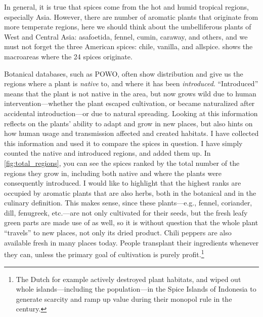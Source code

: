 In general, it is true that spices come from the hot and humid tropical regions, especially Asia. However, there are number of aromatic plants that originate from more temperate regions, here we should think about the umbelliferous plants of West and Central Asia: asafoetida, fennel, cumin, caraway, and others, and we must not forget the three American spices: chile, vanilla, and allspice.  shows the macroareas where the 24 spices originate.

Botanical databases, such as \gls{POWO}, often show distribution and  give us the regions where a plant is \textit{native} to, and where it has been \textit{introduced}. ``Introduced'' means that the plant is not native in the area, but now grows wild due to human intervention---whether the plant escaped cultivation, or became naturalized after accidental introduction---or due to natural spreading. Looking at this information reflects on the plants' ability to adapt and grow in new places, but also hints on how human usage and transmission affected and created habitats. I have collected this information and used it to compare the spices in question. I have simply counted the native and introduced regions, and added them up. In \cref{fig:total_regions}, you can see the spices ranked by the total number of the regions they grow in, including both native and where the plants were consequently introduced. I would like to highlight that the highest ranks are occupied by aromatic plants that are also herbs, both in the botanical and in the culinary definition. This makes sense, since these plants---e.g., fennel, coriander, dill, fenugreek, etc.---are not only cultivated for their seeds, but the fresh leafy green parts are made use of as well, so it is without question that the whole plant ``travels'' to new places, not only its dried product. Chili peppers are also available fresh in many places today. People transplant their ingredients whenever they can, unless the primary goal of cultivation is purely profit.\footnote{The Dutch for example actively destroyed plant habitats, and wiped out whole islands---including the population---in the Spice Islands of Indonesia to generate scarcity and ramp up value during their monopol rule in the  century.}

